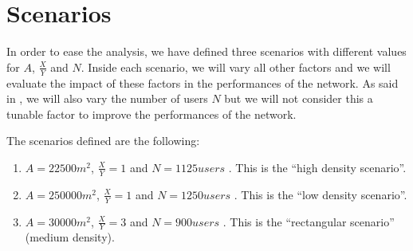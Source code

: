 \section{Scenarios}\label{sec:scenarios}

In order to ease the analysis, we have defined three scenarios with different
values for \(A\), \(\frac{X}{Y}\) and \(N\). Inside each scenario, we will vary
all other factors and we will evaluate the impact of these factors in the
performances of the network. As said in , we will also vary
the number of users \(N\) but we will not consider this a tunable factor to
improve the performances of the network.

The scenarios defined are the following:
\begin{enumerate}
	\item \(A = 22500m^2\), \(\frac{X}{Y} = 1\)  and \(N = 1125\mathit{users}\) . This is the ``high density
		scenario''.
	\item \(A = 250000m^2\), \(\frac{X}{Y} = 1\)  and \(N = 1250\mathit{users}\) . This is the ``low density
		scenario''.
	\item \(A = 30000m^2\), \(\frac{X}{Y} = 3\)  and \(N = 900\mathit{users}\) . This is the
		``rectangular scenario'' (medium density).
\end{enumerate}


